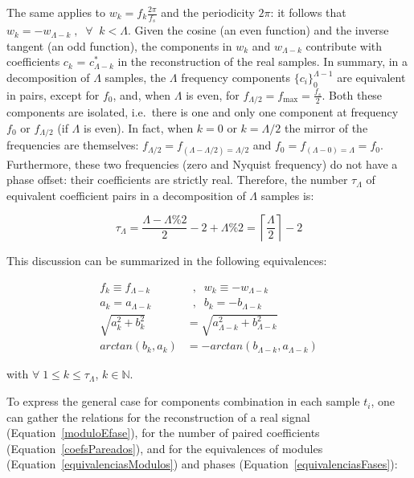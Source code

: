 The same applies to $w_k=f_k\frac{2\pi}{f_s}$ and the periodicity $2\pi$:
it follows that $w_k=-w_{\Lambda-k} \; ,\;\; \forall \;\; k<\Lambda$.
Given the cosine (an even function) and the inverse tangent (an odd function),
the components in $w_k$ and $w_{\Lambda-k}$ contribute with coefficients $c_k$ = $c^*_{\Lambda-k}$ in the reconstruction of the real samples.
In summary, in a decomposition of $\Lambda$ samples, the $\Lambda$ frequency components $\{c_i\}_0^{\Lambda-1}$ are equivalent in pairs,
except for $f_0$, and, when $\Lambda$ is even, for $f_{\Lambda/2}=f_{\text{max}}=\frac{f_s}{2}$.
Both these components are isolated, i.e.\ there is one and only one component at frequency $f_0$ or $f_{\Lambda/2}$ (if $\Lambda$ is even).
In fact, when $k=0$ or $k=\Lambda/2$ the mirror of the frequencies are themselves: $f_{\Lambda/2}=f_{(\Lambda-\Lambda/2) = \Lambda/2}$ and $f_0=f_{(\Lambda-0)=\Lambda}=f_0$.
Furthermore, these two frequencies (zero and Nyquist frequency) do not have a phase offset: their coefficients are strictly real.
Therefore, the number $\tau_\Lambda$ of equivalent coefficient pairs in a decomposition of $\Lambda$ samples is:

\begin{equation}\label{coefsPareados}
	\tau_\Lambda = \frac{\Lambda - \Lambda \% 2}{2} -2 +\Lambda \% 2 = \left \lceil \frac{\Lambda}{2} \right \rceil -2
\end{equation}

This discussion can be summarized in the following equivalences:

\begin{align}
	f_{k}\equiv f_{\Lambda-k}& \;\; , \;\; w_{k}\equiv-w_{\Lambda-k} \label{equivalenciasFreqs} \\
	 a_k = a_{\Lambda -k}& \;\; , \;\;b_k = - b_{\Lambda -k} \label{equavalenciasTermos} \\
	\sqrt{a_k^2 + b_k^2} & = \sqrt{a_{\Lambda - k}^2 + b_{\Lambda -k}^2}\label{equivalenciasModulos} \\
	arctan(b_k, a_k) & = -arctan(b_{\Lambda -k}, a_{\Lambda - k}) \label{equivalenciasFases}
\end{align}

\noindent with
$\forall \; 1 \leq k \leq \tau_\Lambda$, 
$k \in \mathbb{N}$.

To express the general case for components combination in each sample $t_i$,
one can gather the relations for the reconstruction of a real signal (Equation~\ref{moduloEfase}),
for the number of paired coefficients (Equation~\ref{coefsPareados}),
and for the equivalences of modules (Equation~\ref{equivalenciasModulos})
and phases (Equation~\ref{equivalenciasFases}):

